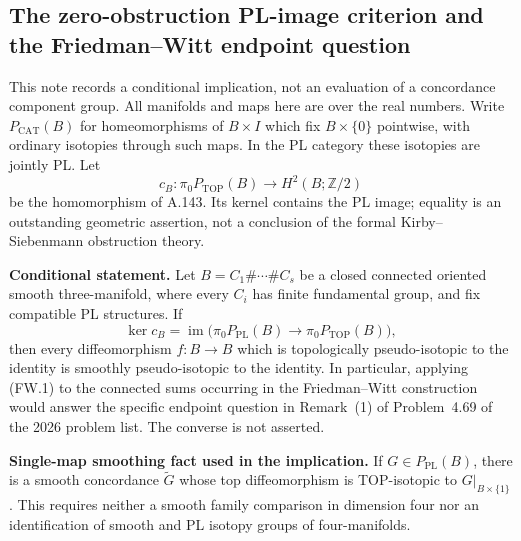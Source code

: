 \subsection*{The zero-obstruction PL-image criterion and the Friedman--Witt endpoint question}

This note records a conditional implication, not an evaluation of a
concordance component group. All manifolds and maps here are over the
real numbers. Write $P_{\mathrm{CAT}}(B)$ for homeomorphisms of $B\times I$
which fix $B\times\{0\}$ pointwise, with ordinary isotopies through such
maps. In the PL category these isotopies are jointly PL. Let
\[
 c_B:\pi_0P_{\mathrm{TOP}}(B)\longrightarrow H^2(B;\mathbb Z/2)
\]
be the homomorphism of A.143. Its kernel contains the PL image; equality
is an outstanding geometric assertion, not a conclusion of the formal
Kirby--Siebenmann obstruction theory.

\textbf{Conditional statement.}\quad
Let $B=C_1\#\cdots\#C_s$ be a closed connected oriented smooth
three-manifold, where every $C_i$ has finite fundamental group, and fix
compatible PL structures. If
\[
 \ker c_B=
 \operatorname{im}\bigl(\pi_0P_{\mathrm{PL}}(B)
                    \longrightarrow\pi_0P_{\mathrm{TOP}}(B)\bigr),
 \tag{FW.1}
\]
then every diffeomorphism $f:B\to B$ which is topologically
pseudo-isotopic to the identity is smoothly pseudo-isotopic to the
identity. In particular, applying (FW.1) to the connected sums occurring
in the Friedman--Witt construction would answer the specific endpoint
question in Remark~(1) of Problem~4.69 of the 2026 problem list.
The converse is not asserted.

\textbf{Single-map smoothing fact used in the implication.}\quad
If $G\in P_{\mathrm{PL}}(B)$, there is a smooth concordance $\widetilde G$
whose top diffeomorphism is TOP-isotopic to $G|_{B\times\{1\}}$.
This requires neither a smooth family comparison in dimension four nor
an identification of smooth and PL isotopy groups of four-manifolds.

